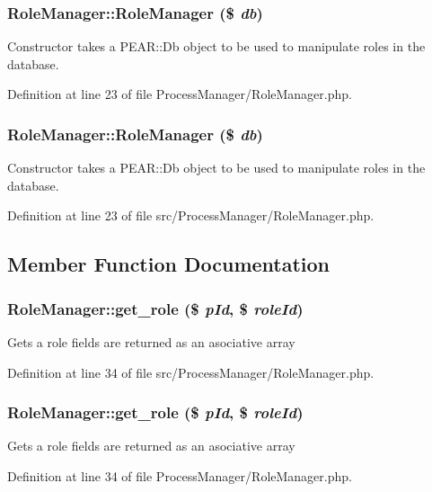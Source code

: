 \subsubsection{\setlength{\rightskip}{0pt plus 5cm}Role\-Manager::Role\-Manager (\$ {\em db})}\label{classRoleManager_a0}


Constructor takes a PEAR::Db object to be used to manipulate roles in the database. 

Definition at line 23 of file Process\-Manager/Role\-Manager.php.
\subsubsection{\setlength{\rightskip}{0pt plus 5cm}Role\-Manager::Role\-Manager (\$ {\em db})}\label{classRoleManager_a8}


Constructor takes a PEAR::Db object to be used to manipulate roles in the database. 

Definition at line 23 of file src/Process\-Manager/Role\-Manager.php.

\subsection{Member Function Documentation}
\subsubsection{\setlength{\rightskip}{0pt plus 5cm}Role\-Manager::get\_\-role (\$ {\em p\-Id}, \$ {\em role\-Id})}\label{classRoleManager_a9}


Gets a role fields are returned as an asociative array 

Definition at line 34 of file src/Process\-Manager/Role\-Manager.php.
\subsubsection{\setlength{\rightskip}{0pt plus 5cm}Role\-Manager::get\_\-role (\$ {\em p\-Id}, \$ {\em role\-Id})}\label{classRoleManager_a1}


Gets a role fields are returned as an asociative array 

Definition at line 34 of file Process\-Manager/Role\-Manager.php.
